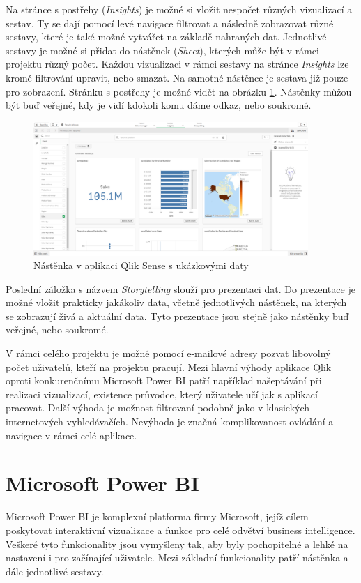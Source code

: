 \documentclass[czech,master]{diploma}
\begin{document}
Na stránce s postřehy (\textit{Insights})  je možné si vložit nespočet různých vizualizací a sestav. Ty se dají pomocí levé navigace filtrovat a následně zobrazovat různé sestavy, které je také možné vytvářet na základě nahraných dat. Jednotlivé sestavy je možné si přidat do nástěnek (\textit{Sheet}), kterých může být v rámci projektu různý počet. Každou vizualizaci v rámci sestavy na stránce \textit{Insights} lze kromě filtrování upravit, nebo smazat. Na samotné nástěnce je sestava již pouze pro zobrazení. Stránku s postřehy je možné vidět na obrázku \ref{fig:qlik_dashboard}. Nástěnky můžou být buď veřejné, kdy je vidí kdokoli komu dáme odkaz, nebo soukromé.

\begin{figure}[!ht]
    \centering
    \includegraphics[width=0.93\textwidth]{Diplomka/Figures/qlik_dashboard.png}
    \caption{Nástěnka v aplikaci Qlik Sense s ukázkovými daty}
    \label{fig:qlik_dashboard}
\end{figure}

Poslední záložka s názvem \textit{Storytelling} slouží pro prezentaci dat. Do prezentace je možné vložit prakticky jakákoliv data, včetně jednotlivých nástěnek, na kterých se zobrazují živá a aktuální data. Tyto prezentace jsou stejně jako nástěnky buď veřejné, nebo soukromé.

V rámci celého projektu je možné pomocí e-mailové adresy pozvat libovolný počet uživatelů, kteří na projektu pracují. Mezi hlavní výhody aplikace Qlik oproti konkurenčnímu Microsoft Power BI patří například našeptávání při realizaci vizualizací, existence průvodce, který uživatele učí jak s aplikací pracovat. Další výhoda je možnost filtrovaní podobně jako v klasických internetových vyhledávačích. Nevýhoda je značná komplikovanost ovládání a navigace v rámci celé aplikace.

\section{Microsoft Power BI}
\label{sec:microsoft_power_bi}
Microsoft Power BI je komplexní platforma firmy Microsoft, jejíž cílem poskytovat interaktivní vizualizace a funkce pro celé odvětví business intelligence. Veškeré tyto funkcionality jsou vymyšleny tak, aby byly pochopitelné a lehké na nastavení i pro začínající uživatele. Mezi základní funkcionality patří nástěnka a dále jednotlivé sestavy.
\end{document}
